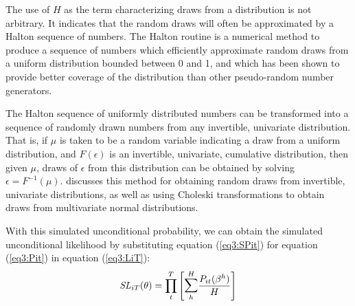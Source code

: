 \documentclass[../main.tex]{subfiles}
\begin{document}
The use of $H$ as the term characterizing draws from a distribution is not arbitrary.
It indicates that the random draws will often be approximated by a Halton sequence of numbers.
The Halton routine is a numerical method to produce a sequence of numbers which efficiently approximate random draws from a uniform distribution bounded between 0 and 1, and which has been shown to provide better coverage of the distribution than other pseudo-random{\footnotemark} number generators.{\footnotemark}

\addtocounter{footnote}{-2}

The Halton sequence of uniformly distributed numbers can be transformed into a sequence of randomly drawn numbers from any invertible, univariate distribution.
That is, if $\mu$ is taken to be a random variable indicating a draw from a uniform distribution, and $F(\epsilon)$ is an invertible, univariate, cumulative distribution, then given $\mu$, draws of $\epsilon$ from this distribution can be obtained by solving $\epsilon = F^{-1}(\mu)$.
\textcite[236]{Train2002} discusses this method for obtaining random draws from invertible, univariate distributions, as well as using Choleski transformations to obtain draws from multivariate normal distributions.

With this simulated unconditional probability, we can obtain the simulated unconditional likelihood by substituting equation (\ref{eq3:SPit}) for equation (\ref{eq3:Pit}) in equation (\ref{eq3:LiT}):
\begin{equation}
	\label{eq3:SLiT}
	\mathit{SL}_{iT}(\theta) = \prod_t^T \left[ \mathlarger{\sum}_h^H \frac{ P_{it}(\beta^h) }{H} \right]
\end{equation}
\end{document}
